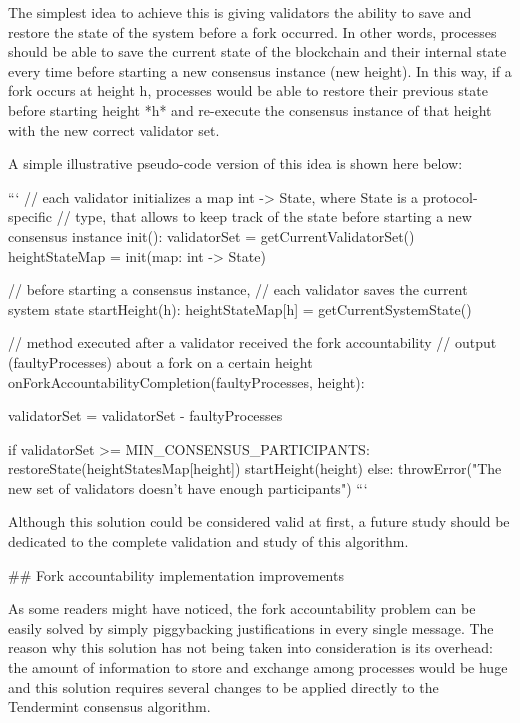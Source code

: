 \documentclass[a4paper,11pt,oneside]{report}
\begin{document}
\begin{markdown}
The simplest idea to achieve this is giving validators the ability to save and restore the state of the system before a fork occurred.
In other words, processes should be able to save the current state of the blockchain and their internal state every time before starting a new consensus instance (new height). In this way, if a fork occurs at height h, processes would be able to restore their previous state before starting height *h* and re-execute the consensus instance of that height with the new correct validator set.

A simple illustrative pseudo-code version of this idea is shown here below:

    ```
    // each validator initializes a map int -> State, where State is a protocol-specific
    // type, that allows to keep track of the state before starting a new consensus instance
    init():
        validatorSet = getCurrentValidatorSet()
        heightStateMap = init(map: int -> State)

    // before starting a consensus instance, 
    // each validator saves the current system state
    startHeight(h):
        heightStateMap[h] = getCurrentSystemState()	

    // method executed after a validator received the fork accountability
    // output (faultyProcesses) about a fork on a certain height
    onForkAccountabilityCompletion(faultyProcesses, height):

        validatorSet = validatorSet - faultyProcesses

        if validatorSet >= MIN_CONSENSUS_PARTICIPANTS:
            restoreState(heightStatesMap[height])
            startHeight(height)
        else:
            throwError("The new set of validators doesn't have enough participants")
    ```

Although this solution could be considered valid at first, a future study should be dedicated to the complete validation and study of this algorithm.


## Fork accountability implementation improvements

As some readers might have noticed, the fork accountability problem can be easily solved by simply piggybacking justifications in every single message.
The reason why this solution has not being taken into consideration is its overhead: the amount of information to store and exchange among processes would be huge and this solution requires several changes to be applied directly to the Tendermint consensus algorithm. 


\end{markdown}
\end{document}
